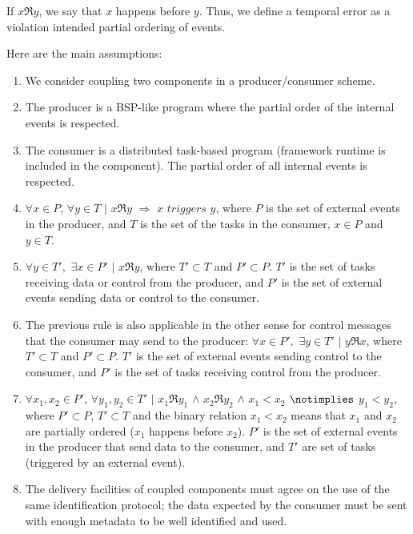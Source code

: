 If $x\Re y $,  we say that $x$ happens before $y$. Thus, we define a temporal error as a violation intended partial ordering of events. 

Here are the main assumptions:
\begin{enumerate}
    \item We consider coupling two components in a producer/consumer scheme.\label{rule1}
    
    \item The producer is a BSP-like program where the partial order of the internal events is respected.\label{rule2}
    
    \item The consumer is a distributed task-based program (framework runtime is included in the component). The partial order of all internal events is respected.\label{rule3}
    
    \item $\forall x \in P$,  $ \forall y \in T $ $ | $ $x \Re y $ $\Rightarrow$ $ x $ $ triggers $ $ y$, where $P$ is the set of external events in the producer, and $T$ is the set of the \deisa tasks in the consumer, $x \in P $ and $y \in T$.\label{rule4}
    
    \item $\forall y \in T', $ $ \exists x \in P' $ $|$ $ x \Re y$, where $T' \subset T$ and $P' \subset P$. $T'$  is the set of \deisa tasks receiving data or control from the producer, and  $P'$ is the set of external events sending data or control to the consumer.\label{rule5}
    
    \item The previous rule is also applicable in the other sense for control messages that the consumer may send to the producer: $\forall x \in P', $ $ \exists y \in T' $ $|$ $ y \Re x$,  where $T' \subset T$ and $P' \subset P$. $T'$  is the set of external events sending control to the consumer, and  $P'$ is the set of \deisa tasks receiving control from the producer.\label{rule6}  

    \item  $\forall x_1, x_2 \in P' $, $ \forall y_1, y_2 \in T' $ $ | $  $x_1 \Re y_1$ $ \wedge $ $x_2 \Re y_2 $  $ \wedge $  $ x_1 < x_2 $ $\notimplies$ $y_1 < y_2$, where $P' \subset P$, $T' \subset T$ and the binary relation $x_1 < x_2$ means that $x_1$ and $x_2$ are partially ordered ($x_1$ happens before $x_2$). $P'$ is the set of external events in the producer that send data to the consumer, and $T'$ are set of \deisa tasks (triggered by an external event).\label{rule7}

    \item The delivery facilities of coupled components must agree on the use of the same identification protocol; the data expected by the consumer must be sent with enough metadata to be well identified and used.\label{rule8}   
    
\end{enumerate}

